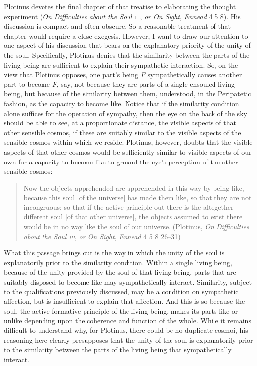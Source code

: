 Plotinus devotes the final chapter of that treatise to elaborating the thought experiment (\emph{On Difficulties about the Soul} \textsc{iii}, \emph{or On Sight}, \emph{Ennead} 4 5 8). His discussion is compact and often obscure. So a reasonable treatment of that chapter would require a close exegesis. However, I want to draw our attention to one aspect of his discussion that bears on the explanatory priority of the unity of the soul. Specifically, Plotinus denies that the similarity between the parts of the living being are sufficient to explain their sympathetic interaction. So, on the view that Plotinus opposes, one part's being \emph{F} sympathetically causes another part to become \emph{F}, say, not because they are parts of a single ensouled living being, but because of the similarity between them, understood, in the Peripatetic fashion, as the capacity to become like. Notice that if the similarity condition alone suffices for the operation of sympathy, then the eye on the back of the sky should be able to see, at a proportionate distance, the visible aspects of that other sensible cosmos, if these are suitably similar to the visible aspects of the sensible cosmos within which we reside. Plotinus, however, doubts that the visible aspects of that other cosmos would be sufficiently similar to visible aspects of our own for a capacity to become like to ground the eye's perception of the other sensible cosmos:
\begin{quote}
	Now the objects apprehended are apprehended in this way by being like, because this soul [of the universe] has made them like, so that they are not incongruous; so that if the active principle out there is the altogether different soul [of that other universe], the objects assumed to exist there would be in no way like the soul of our universe. (Plotinus, \emph{On Difficulties about the Soul \textsc{iii}}, \emph{or On Sight}, \emph{Ennead} 4 5 8 26--31)
\end{quote}
What this passage brings out is the way in which the unity of the soul is explanatorily prior to the similarity condition. Within a single living being, because of the unity provided by the soul of that living being, parts that are suitably disposed to become like may sympathetically interact. Similarity, subject to the qualifications previously discussed, may be a condition on sympathetic affection, but is insufficient to explain that affection. And this is so because the soul, the active formative principle of the living being, makes its parts like or unlike depending upon the coherence and function of the whole. While it remains difficult to understand why, for Plotinus, there could be no duplicate cosmoi, his reasoning here clearly presupposes that the unity of the soul is explanatorily prior to the similarity between the parts of the living being that sympathetically interact.

